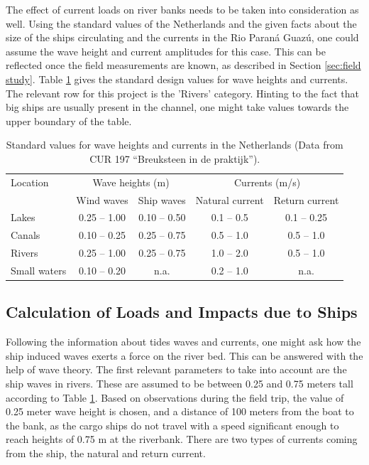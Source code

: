 The effect of current loads on river banks needs to be taken into consideration as well. Using the standard values of the Netherlands and the given facts about the size of the ships circulating and the currents in the Rio Paraná Guazú, one could assume the wave height and current amplitudes for this case. This can be reflected once the field measurements are known, as described in Section \ref{sec:field study}.
Table \ref{tab:standard_values} gives the standard design values for wave heights and currents. The relevant row for this project is the 'Rivers' category. Hinting to the fact that big ships are usually present in the channel, one might take values towards the upper boundary of the table.

\begin{table}[H]
    \centering
    \caption{Standard values for wave heights and currents in the Netherlands (Data from CUR 197 ``Breuksteen in de praktijk'').}
    \label{tab:standard_values}
    \begin{tabular}{lcccc}
        \toprule
        Location & \multicolumn{2}{c}{Wave heights (m)} & \multicolumn{2}{c}{Currents (m/s)} \\
        \cmidrule(lr){2-3} \cmidrule(l){4-5}
        & Wind waves & Ship waves & Natural current & Return current \\
        \midrule
        Lakes          & 0.25 -- 1.00  & 0.10 -- 0.50  & 0.1 -- 0.5  & 0.1 -- 0.25 \\
        Canals         & 0.10 -- 0.25  & 0.25 -- 0.75  & 0.5 -- 1.0  & 0.5 -- 1.0  \\
        Rivers         & 0.25 -- 1.00  & 0.25 -- 0.75  & 1.0 -- 2.0  & 0.5 -- 1.0  \\
        Small waters   & 0.10 -- 0.20  & n.a.          & 0.2 -- 1.0  & n.a.       \\
        \bottomrule
    \end{tabular}
\end{table}


\subsection{Calculation of Loads and Impacts due to Ships}
Following the information about tides waves and currents, one might ask how the ship induced waves exerts a force on the river bed. This can be answered with the help of wave theory. The first relevant parameters to take into account are the ship waves in rivers. These are assumed to be between 0.25 and 0.75 meters tall according to Table \ref{tab:standard_values}. Based on observations during the field trip, the value of 0.25 meter wave height is chosen, and a distance of 100 meters from the boat to the bank, as the cargo ships do not travel with a speed significant enough to reach heights of 0.75 m at the riverbank.
There are two types of currents coming from the ship, the natural and return current.

